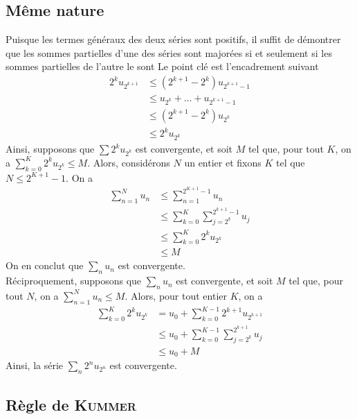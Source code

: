 \subsection{Même nature}

Puisque les termes généraux des deux séries sont positifs, il suffit de démontrer que les sommes partielles d'une des séries sont majorées si et seulement si les sommes partielles de l'autre le sont Le point clé est l'encadrement suivant
\[
    \begin{aligned}
        2^ku_{2^{k+1}}&\leqslant (2^{k+1}-2^k)u_{2^{k+1}-1}\\
        &\leqslant u_{2^k}+\dots+u_{2^{k+1}-1}\\
        &\leqslant (2^{k+1}-2^k)u_{2^k}\\
        &\leqslant 2^k u_{2^k}
    \end{aligned}
\]
Ainsi, supposons que $\sum\limits 2^k u_{2^k}$ est convergente, et soit $M$ tel que, pour tout $K$,
on a $\sum\limits_{k=0}^K 2^k u_{2^k}\leq M$. Alors, considérons $N$ un entier et fixons $K$ tel que $N\leq 2^{K+1}-1$.
On a
\[
    \begin{aligned}
        \sum_{n=1}^N u_n &\leqslant \sum_{n=1}^{2^{K+1}-1}u_n\\
        &\leqslant \sum_{k=0}^{K}\sum_{j=2^k}^{2^{k+1}-1}u_j\\
        &\leqslant \sum_{k=0}^K 2^k u_{2^k}\\
        &\leqslant M
    \end{aligned}
\]
On en conclut que $\sum\limits_n u_n$ est convergente.\\
Réciproquement, supposons que $\sum\limits_n u_n$ est convergente, et soit $M$ tel que, pour tout $N$, on a 
$\sum\limits_{n=1}^N u_n\leqslant M$. Alors, pour tout entier $K$, on a
\[
    \begin{aligned}
        \sum_{k=0}^K 2^k u_{2^k} &= u_0+\sum\limits_{k=0}^{K-1}2^{k+1}u_{2^{k+1}}\\
        &\leqslant u_0+\sum\limits_{k=0}^{K-1}\sum\limits_{j=2^k}^{2^{k+1}}u_j\\
        &\leqslant u_0+M
    \end{aligned}
\]
Ainsi, la série $\sum\limits_n 2^n u_{2^n}$ est convergente.

\subsection{Règle de \textsc{Kummer}}

